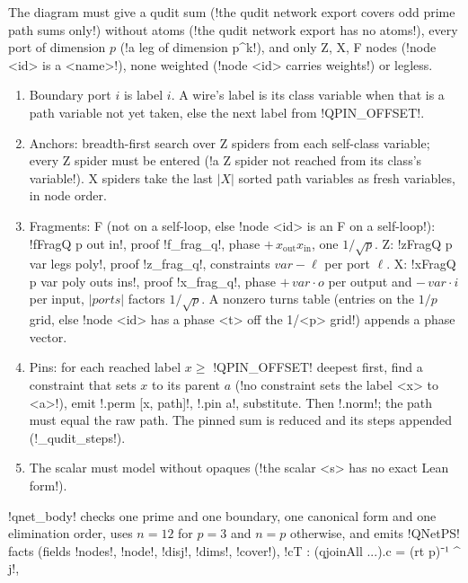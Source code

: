 {{{\begin{algorithm}\label{alg:lean-export-qnet-side}
The diagram must give a qudit sum (\lexcode!the qudit network export covers odd prime path sums only!) without atoms (\lexcode!the qudit network export has no atoms!), every port of dimension
$p$ (\lexcode!a leg of dimension p^k!), and only Z, X, F nodes (\lexcode!node <id> is a <name>!),
none weighted (\lexcode!node <id> carries weights!) or legless.
\begin{enumerate}
\item Boundary port $i$ is label $i$. A wire's label is its class variable when that is a path
variable not yet taken, else the next label from \lexpy!QPIN_OFFSET!.
\item Anchors: breadth-first search over Z spiders from each self-class variable; every Z spider
must be entered (\lexcode!a Z spider not reached from its class's variable!). X spiders take the
last $|X|$ sorted path variables as fresh variables, in node order.
\item Fragments: F (not on a self-loop, else \lexcode!node <id> is an F on a self-loop!):
\lexlean!fFragQ p out in!, proof \lexlean!f_frag_q!, phase $+\,x_{\mathrm{out}}x_{\mathrm{in}}$, one
$1/\sqrt p$. Z: \lexlean!zFragQ p var legs poly!, proof \lexlean!z_frag_q!, constraints
$\mathit{var}-\ell$ per port $\ell$. X: \lexlean!xFragQ p var poly outs ins!, proof
\lexlean!x_frag_q!, phase $+\,\mathit{var}\cdot o$ per output and $-\,\mathit{var}\cdot i$ per
input, $|\mathit{ports}|$ factors $1/\sqrt p$. A nonzero turns table (entries on the $1/p$ grid,
else \lexcode!node <id> has a phase <t> off the 1/<p> grid!) appends a phase vector.
\item Pins: for each reached label $x \ge$ \lexpy!QPIN_OFFSET! deepest first, find a constraint
that sets $x$ to its parent $a$ (\lexcode!no constraint sets the label <x> to <a>!), emit
\lexlean!.perm [x, path]!, \lexlean!.pin a!, substitute. Then \lexlean!.norm!; the path must equal the
raw path. The pinned sum is reduced and its steps appended (\lexpy!_qudit_steps!).
\item The scalar must model without opaques (\lexcode!the scalar <s> has no exact Lean form!).
\end{enumerate}
\end{algorithm}
\lexpy!qnet_body! checks one prime and one boundary, one canonical form and one elimination order,
uses $n = 12$ for $p=3$ and $n=p$ otherwise, and emits \lexlean!QNetPS! facts (fields \lexlean!nodes!,
\lexlean!node!, \lexlean!disj!, \lexlean!dims!, \lexlean!cover!), \lexlean!cT : (qjoinAll ...).c = (rt p)⁻¹ ^ j!,
}}}
